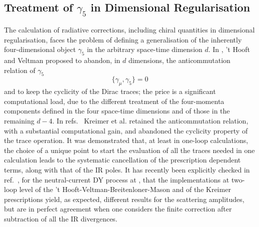 \documentclass[11pt,a4paper]{article}
\begin{document}
\subsection{Treatment of \texorpdfstring{$\gamma_5$}{g5} in Dimensional Regularisation}
\label{sec:gamma5}

The calculation of radiative corrections, including chiral quantities in dimensional regularisation, faces the problem of defining a generalisation of
the inherently four-dimensional object  $\gamma_5$ in the arbitrary space-time dimension $d$.
% 
%
In \cite{'tHooft:1972fi}, 't Hooft and Veltman proposed to abandon, in $d$ dimensions, the anticommutation relation of $\gamma_5$
\begin{equation}
 \{\gamma_\mu,\gamma_5\} = 0
\end{equation}
and to keep the cyclicity of the Dirac traces; the price is a significant
computational load, due to the different treatment of the four-momenta
components defined in the four space-time dimensions and of those
in the remaining $d-4$.
In refs.~\cite{Kreimer:1989ke,Korner:1991sx}
Kreimer et al. retained the anticommutation relation, with a substantial computational gain, and abandoned the cyclicity property of the trace operation.
It was demonstrated that, at least in one-loop calculations, the choice of
a unique point to start the evaluation of  all the traces needed in one calculation
leads to the systematic cancellation of the prescription dependent terms,
along with that of the IR poles.
It has recently been explicitly checked in ref.~\cite{Heller:2020owb},
for the neutral-current DY process at \oaas,
that the implementations at two-loop level of the 't Hooft-Veltman-Breitenloner-Mason and of the Kreimer prescriptions
yield, as expected, different results for the scattering amplitudes,
but are in perfect agreement when one considers the finite correction
after subtraction of all the IR divergences.
%
\end{document}
